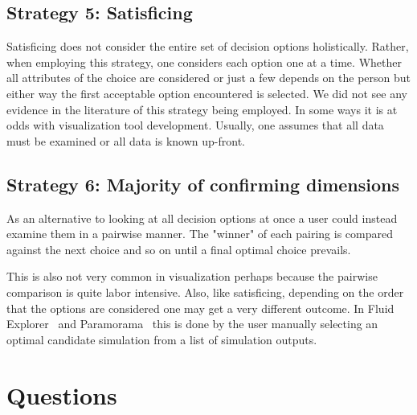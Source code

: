 \subsection{Strategy 5: Satisficing}\label{satisficing}

Satisficing does not consider the entire set of decision options holistically.
Rather, when employing this strategy, one considers each option one at a time.
Whether all attributes of the choice are considered or just a few depends on
the person but either way the first acceptable option encountered is selected.
We did not see any evidence in the literature of this strategy being
employed. In some ways it is at odds with visualization tool development.
Usually, one assumes that all data must be examined or all data is known
up-front.

\subsection{Strategy 6: Majority of confirming
dimensions}\label{majority-of-confirming-dimensions}

As an alternative to looking at all decision options at once a user could 
instead examine them in a pairwise manner. The "winner" of each pairing is
compared against the next choice and so on until a final optimal choice
prevails.

This is also not very common in visualization perhaps because the pairwise
comparison is quite labor intensive. Also, like satisficing, depending on the
order that the options are considered one may get a very different outcome. In
Fluid Explorer~\cite{Bruckner:2010} and Paramorama~\citep{Pretorius:2011} this
is done by the user manually selecting an optimal candidate simulation from 
a list of simulation outputs.


\section{Questions}\label{questions}

